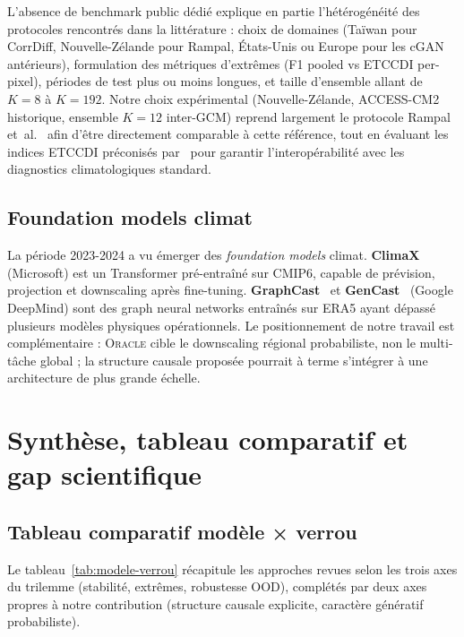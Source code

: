 \documentclass[14pt,a4paper,openany]{extreport}
\newcommand{\Oracle}{\textsc{Oracle}}
\begin{document}
L'absence de benchmark public dédié explique en partie l'hétérogénéité des protocoles rencontrés dans la littérature : choix de domaines (Taïwan pour CorrDiff, Nouvelle-Zélande pour Rampal, États-Unis ou Europe pour les cGAN antérieurs), formulation des métriques d'extrêmes (F1 pooled vs ETCCDI per-pixel), périodes de test plus ou moins longues, et taille d'ensemble allant de $K=8$ à $K=192$. Notre choix expérimental (Nouvelle-Zélande, ACCESS-CM2 historique, ensemble $K=12$ inter-GCM) reprend largement le protocole Rampal et~al.~\cite{rampal_cgan_2024} afin d'être directement comparable à cette référence, tout en évaluant les indices ETCCDI préconisés par~\cite{zhang_etccdi_2011} pour garantir l'interopérabilité avec les diagnostics climatologiques standard.

\subsection{Foundation models climat}
\label{ssec:soa-foundation}

La période 2023-2024 a vu émerger des \emph{foundation models} climat. \textbf{ClimaX}~\cite{nguyen_climax_2023} (Microsoft) est un Transformer pré-entraîné sur CMIP6, capable de prévision, projection et downscaling après fine-tuning. \textbf{GraphCast}~\cite{lam_graphcast_2023} et \textbf{GenCast}~\cite{price_gencast_2024} (Google DeepMind) sont des graph neural networks entraînés sur ERA5 ayant dépassé plusieurs modèles physiques opérationnels. Le positionnement de notre travail est complémentaire : \Oracle{} cible le downscaling régional probabiliste, non le multi-tâche global ; la structure causale proposée pourrait à terme s'intégrer à une architecture de plus grande échelle.

\section{Synthèse, tableau comparatif et gap scientifique}
\label{sec:soa-synthese}

\subsection{Tableau comparatif modèle × verrou}
\label{ssec:soa-tableau}

Le tableau~\ref{tab:modele-verrou} récapitule les approches revues selon les trois axes du trilemme (stabilité, extrêmes, robustesse OOD), complétés par deux axes propres à notre contribution (structure causale explicite, caractère génératif probabiliste).
\end{document}
